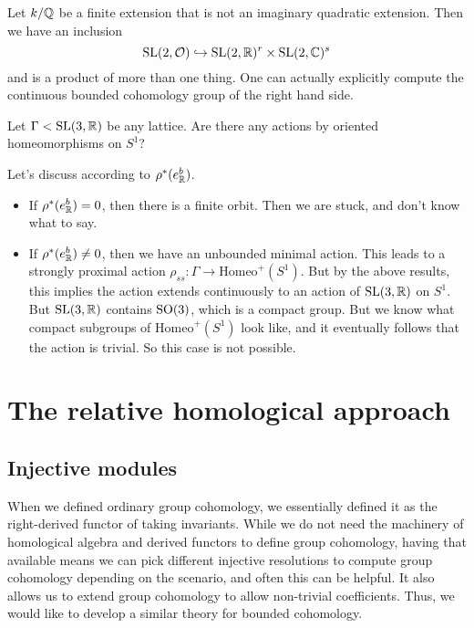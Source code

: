 \documentclass[a4paper]{article}
\newcommand\Homeo{\mathrm{Homeo}}
\begin{document}
\begin{eg}
  Let $k/\mathbb{Q}$ be a finite extension that is not an imaginary quadratic extension. Then we have an inclusion
  \[
    \mathrm{SL}(2, \mathcal{O}) \hookrightarrow \mathrm{SL}(2, \mathbb{R})^r \times \mathrm{SL}(2, \mathbb{C})^s
  \]
  and is a product of more than one thing. One can actually explicitly compute the continuous bounded cohomology group of the right hand side.
\end{eg}

\begin{ex}
  Let $\Gamma < \mathrm{SL}(3, \mathbb{R})$ be any lattice. Are there any actions by oriented homeomorphisms on $S^1$?

  Let's discuss according to $\rho^*(e^b_{\mathbb{R}})$.
  \begin{itemize}
    \item If $\rho^*(e^b_{\mathbb{R}}) = 0$, then there is a finite orbit. Then we are stuck, and don't know what to say.
    \item If $\rho^*(e^b_{\mathbb{R}}) \not= 0$, then we have an unbounded minimal action. This leads to a strongly proximal action $\rho_{ss}\colon \Gamma \to \Homeo^+(S^1)$. But by the above results, this implies the action extends continuously to an action of $\mathrm{SL}(3, \mathbb{R})$ on $S^1$. But $\mathrm{SL}(3, \mathbb{R})$ contains $\mathrm{SO}(3)$, which is a compact group. But we know what compact subgroups of $\Homeo^+(S^1)$ look like, and it eventually follows that the action is trivial. So this case is not possible.
  \end{itemize}
\end{ex}


\section{The relative homological approach}
\subsection{Injective modules}
When we defined ordinary group cohomology, we essentially defined it as the right-derived functor of taking invariants. While we do not need the machinery of homological algebra and derived functors to define group cohomology, having that available means we can pick different injective resolutions to compute group cohomology depending on the scenario, and often this can be helpful. It also allows us to extend group cohomology to allow non-trivial coefficients. Thus, we would like to develop a similar theory for bounded cohomology.
\end{document}
